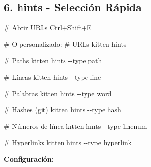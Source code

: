 \documentclass[
  doc,
  floatsintext,
  longtable,
  a4paper,
  nolmodern,
  notxfonts,
  notimes,
  12pt,
  colorlinks=true,linkcolor=blue,citecolor=blue,urlcolor=blue]{apa7}
\newenvironment{Shaded}{\begin{snugshade}}{\end{snugshade}}
\newcommand{\AttributeTok}[1]{\textcolor[rgb]{0.40,0.45,0.13}{#1}}
\newcommand{\CommentTok}[1]{\textcolor[rgb]{0.37,0.37,0.37}{#1}}
\newcommand{\ExtensionTok}[1]{\textcolor[rgb]{0.00,0.23,0.31}{#1}}
\newcommand{\NormalTok}[1]{\textcolor[rgb]{0.00,0.23,0.31}{#1}}
\begin{document}
\subsection{6. hints - Selección
Rápida}\label{hints---selecciuxf3n-ruxe1pida}

\begin{Shaded}
\begin{Highlighting}[]
\CommentTok{\# Abrir URLs}
\ExtensionTok{Ctrl+Shift+E}

\CommentTok{\# O personalizado:}
\CommentTok{\# URLs}
\ExtensionTok{kitten}\NormalTok{ hints}

\CommentTok{\# Paths}
\ExtensionTok{kitten}\NormalTok{ hints }\AttributeTok{{-}{-}type}\NormalTok{ path}

\CommentTok{\# Líneas}
\ExtensionTok{kitten}\NormalTok{ hints }\AttributeTok{{-}{-}type}\NormalTok{ line}

\CommentTok{\# Palabras}
\ExtensionTok{kitten}\NormalTok{ hints }\AttributeTok{{-}{-}type}\NormalTok{ word}

\CommentTok{\# Hashes (git)}
\ExtensionTok{kitten}\NormalTok{ hints }\AttributeTok{{-}{-}type}\NormalTok{ hash}

\CommentTok{\# Números de línea}
\ExtensionTok{kitten}\NormalTok{ hints }\AttributeTok{{-}{-}type}\NormalTok{ linenum}

\CommentTok{\# Hyperlinks}
\ExtensionTok{kitten}\NormalTok{ hints }\AttributeTok{{-}{-}type}\NormalTok{ hyperlink}
\end{Highlighting}
\end{Shaded}

\textbf{Configuración:}
\end{document}
